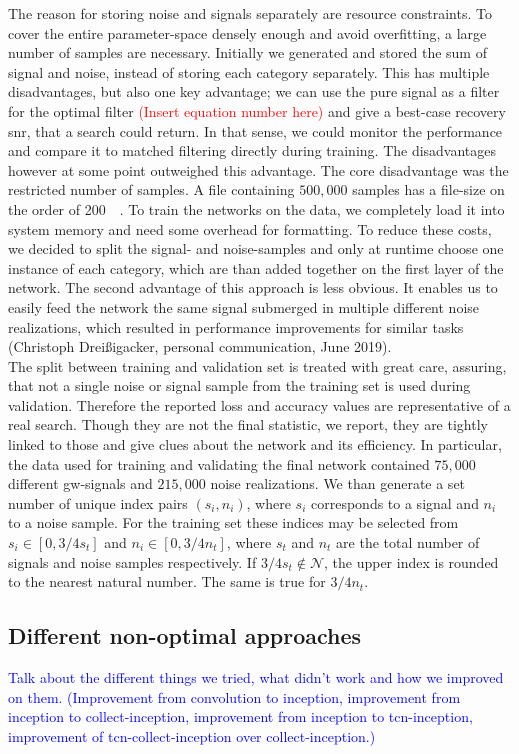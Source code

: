 The reason for storing noise and signals separately are resource constraints. To cover the entire parameter-space densely enough and avoid overfitting, a large number of samples are necessary. Initially we generated and stored the sum of signal and noise, instead of storing each category separately. This has multiple disadvantages, but also one key advantage; we can use the pure signal as a filter for the optimal filter \textcolor{red}{(Insert equation number here)} and give a best-case recovery \gls{snr}, that a search could return. In that sense, we could monitor the performance and compare it to matched filtering directly during training. The disadvantages however at some point outweighed this advantage. The core disadvantage was the restricted number of samples. A file containing $500,000$ samples has a file-size on the order of \SI{200}{\giga\byte}. To train the networks on the data, we completely load it into system memory and need some overhead for formatting. To reduce these costs, we decided to split the signal- and noise-samples and only at runtime choose one instance of each category, which are than added together on the first layer of the network. The second advantage of this approach is less obvious. It enables us to easily feed the network the same signal submerged in multiple different noise realizations, which resulted in performance improvements for similar tasks (Christoph Dreißigacker, personal communication, June 2019).\\
The split between training and validation set is treated with great care, assuring, that not a single noise or signal sample from the training set is used during validation. Therefore the reported loss and accuracy values are representative of a real search. Though they are not the final statistic, we report, they are tightly linked to those and give clues about the network and its efficiency. In particular, the data used for training and validating the final network contained $75,000$ different \gls{gw}-signals and $215,000$ noise realizations. We than generate a set number of unique index pairs $(s_i, n_i)$, where $s_i$ corresponds to a signal and $n_i$ to a noise sample. For the training set these indices may be selected from $s_i\in\left[0, 3/4s_t\right]$ and $n_i\in\left[0, 3/4n_t\right]$, where $s_t$ and $n_t$ are the total number of signals and noise samples respectively. If $3/4s_t\notin\mathcal{N}$, the upper index is rounded to the nearest natural number. The same is true for $3/4 n_t$.

\subsection{Different non-optimal approaches}
\textcolor{blue}{Talk about the different things we tried, what didn't work and how we improved on them. (Improvement from convolution to inception, improvement from inception to collect-inception, improvement from inception to tcn-inception, improvement of tcn-collect-inception over collect-inception.)}
